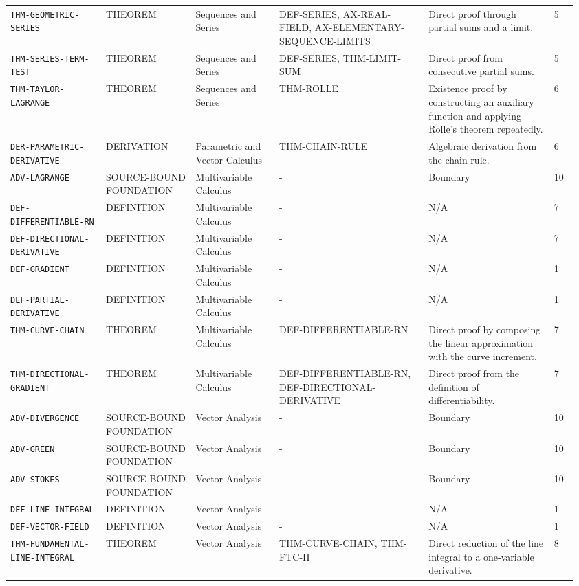 \documentclass[10pt]{article}
\newcommand{\pidraw}[1]{\begingroup\urlstyle{tt}\nolinkurl{#1}\endgroup}
\theoremstyle{definition}
\theoremstyle{remark}
\begin{document}
\begin{landscape}
\begin{longtable}{@{}L{0.16\linewidth}L{0.15\linewidth}L{0.14\linewidth}L{0.25\linewidth}L{0.218\linewidth}C{0.04\linewidth}@{}}
\pidraw{THM-GEOMETRIC-SERIES} & THEOREM & Sequences and Series & DEF-SERIES, AX-REAL-FIELD, AX-ELEMENTARY-SEQUENCE-LIMITS & Direct proof through partial sums and a limit. & 5 \\
\pidraw{THM-SERIES-TERM-TEST} & THEOREM & Sequences and Series & DEF-SERIES, THM-LIMIT-SUM & Direct proof from consecutive partial sums. & 5 \\
\pidraw{THM-TAYLOR-LAGRANGE} & THEOREM & Sequences and Series & THM-ROLLE & Existence proof by constructing an auxiliary function and applying Rolle's theorem repeatedly. & 6 \\
\pidraw{DER-PARAMETRIC-DERIVATIVE} & DERIVATION & Parametric and Vector Calculus & THM-CHAIN-RULE & Algebraic derivation from the chain rule. & 6 \\
\pidraw{ADV-LAGRANGE} & SOURCE-BOUND FOUNDATION & Multivariable Calculus & - & Boundary & 10 \\
\pidraw{DEF-DIFFERENTIABLE-RN} & DEFINITION & Multivariable Calculus & - & N/A & 7 \\
\pidraw{DEF-DIRECTIONAL-DERIVATIVE} & DEFINITION & Multivariable Calculus & - & N/A & 7 \\
\pidraw{DEF-GRADIENT} & DEFINITION & Multivariable Calculus & - & N/A & 1 \\
\pidraw{DEF-PARTIAL-DERIVATIVE} & DEFINITION & Multivariable Calculus & - & N/A & 1 \\
\pidraw{THM-CURVE-CHAIN} & THEOREM & Multivariable Calculus & DEF-DIFFERENTIABLE-RN & Direct proof by composing the linear approximation with the curve increment. & 7 \\
\pidraw{THM-DIRECTIONAL-GRADIENT} & THEOREM & Multivariable Calculus & DEF-DIFFERENTIABLE-RN, DEF-DIRECTIONAL-DERIVATIVE & Direct proof from the definition of differentiability. & 7 \\
\pidraw{ADV-DIVERGENCE} & SOURCE-BOUND FOUNDATION & Vector Analysis & - & Boundary & 10 \\
\pidraw{ADV-GREEN} & SOURCE-BOUND FOUNDATION & Vector Analysis & - & Boundary & 10 \\
\pidraw{ADV-STOKES} & SOURCE-BOUND FOUNDATION & Vector Analysis & - & Boundary & 10 \\
\pidraw{DEF-LINE-INTEGRAL} & DEFINITION & Vector Analysis & - & N/A & 1 \\
\pidraw{DEF-VECTOR-FIELD} & DEFINITION & Vector Analysis & - & N/A & 1 \\
\pidraw{THM-FUNDAMENTAL-LINE-INTEGRAL} & THEOREM & Vector Analysis & THM-CURVE-CHAIN, THM-FTC-II & Direct reduction of the line integral to a one-variable derivative. & 8 \\

\end{longtable}
\end{landscape}
\end{document}
